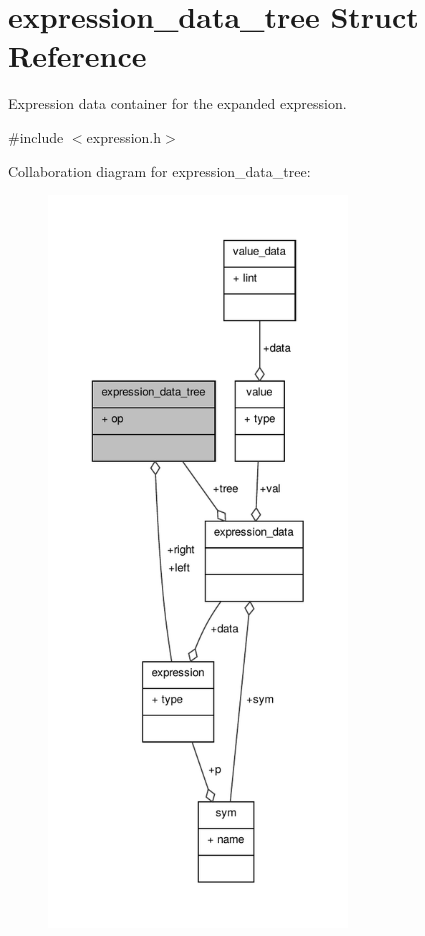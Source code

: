 \hypertarget{structexpression__data__tree}{\section{expression\+\_\+data\+\_\+tree Struct Reference}
\label{structexpression__data__tree}
}


Expression data container for the expanded expression.  




{\ttfamily \#include $<$expression.\+h$>$}



Collaboration diagram for expression\+\_\+data\+\_\+tree\+:\nopagebreak
\begin{figure}[H]
\begin{center}
\leavevmode
\includegraphics[height=550pt]{structexpression__data__tree__coll__graph}
\end{center}
\end{figure}
